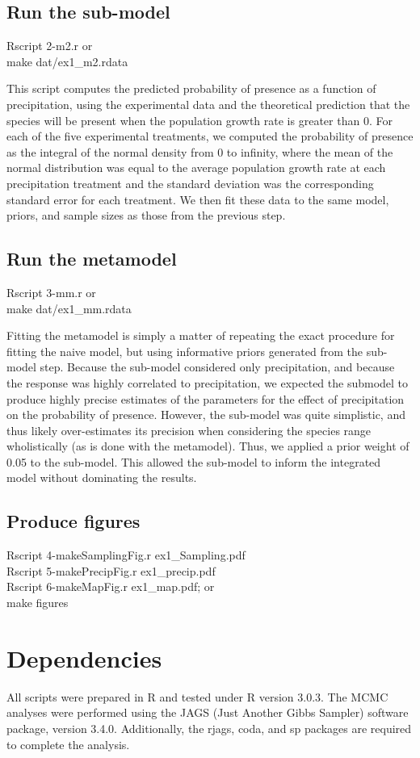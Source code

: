 \documentclass[11pt]{article}
\newcommand{\code}[1]{\colorbox{light-gray}{\ttfamily #1}}
\begin{document}
\subsection{Run the sub-model}
\code{Rscript 2-m2.r} or \\
\code{make dat/ex1\_m2.rdata}

This script computes the predicted probability of presence as a function of precipitation, using the experimental data and the theoretical prediction that the species will be present when the population growth rate is greater than 0.
For each of the five experimental treatments, we computed the probability of presence as the integral of the normal density from 0 to infinity, where the mean of the normal distribution was equal to the average population growth rate at each precipitation treatment and the standard deviation was the corresponding standard error for each treatment.
We then fit these data to the same model, priors, and sample sizes as those from the previous step.

\subsection{Run the metamodel}
\code{Rscript 3-mm.r} or \\
\code{make dat/ex1\_mm.rdata}

Fitting the metamodel is simply a matter of repeating the exact procedure for fitting the naive model, but using informative priors generated from the sub-model step.
Because the sub-model considered only precipitation, and because the response was highly correlated to precipitation, we expected the submodel to produce highly precise estimates of the parameters for the effect of precipitation on the probability of presence.
However, the sub-model was quite simplistic, and thus likely over-estimates its precision when considering the species range wholistically (as is done with the metamodel).
Thus, we applied a prior weight of 0.05 to the sub-model.
This allowed the sub-model to inform the integrated model without dominating the results.

\subsection{Produce figures}
\code{Rscript 4-makeSamplingFig.r ex1\_Sampling.pdf} \\
\code{Rscript 5-makePrecipFig.r ex1\_precip.pdf} \\
\code{Rscript 6-makeMapFig.r ex1\_map.pdf}; or \\
\code{make figures}


\section{Dependencies}
All scripts were prepared in R and tested under R version 3.0.3.
The MCMC analyses were performed using the JAGS (Just Another Gibbs Sampler) software package, version 3.4.0.
Additionally, the \code{rjags}, \code{coda}, and \code{sp} packages are required to complete the analysis.
\end{document}
